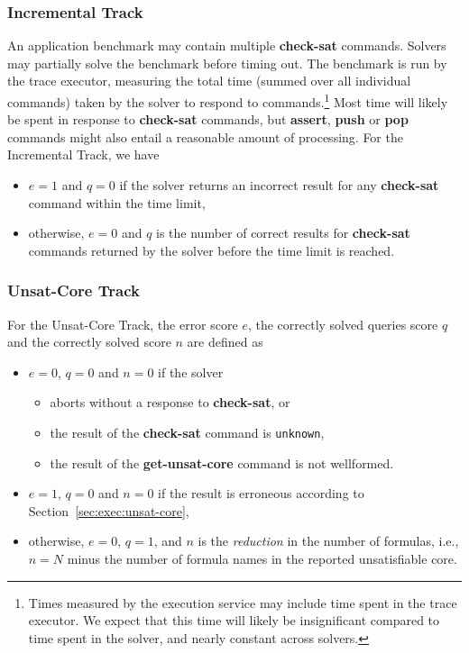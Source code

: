 \documentclass[12pt]{article}
\newcommand{\akey}[1]{\textbf{#1}\xspace}
\newcommand{\inctrack}{Incremental Track\xspace}
\newcommand{\ucoretrack}{Unsat-Core Track\xspace}
\newcommand{\executionservice}{execution service\xspace}
\begin{document}
\subsubsection{\inctrack}
%
An application benchmark may contain multiple \akey{check-sat}
commands.  Solvers may partially solve the benchmark before timing
out.  The benchmark is run by the trace executor, measuring the total
time (summed over all individual commands) taken by the solver to
respond to commands.\footnote{Times measured by the \executionservice may include
  time spent in the trace executor.  We expect that this time will
  likely be insignificant compared to time spent in the solver, and
  nearly constant across solvers.}  Most time will likely be spent in
response to \akey{check-sat} commands, but \akey{assert}, \akey{push}
or \akey{pop} commands might also entail a reasonable amount of
processing.  For the \inctrack, we have
\begin{itemize}
\item $e=1$ and $q=0$ if the solver returns an incorrect result for any
  \akey{check-sat} command within the time limit,
\item otherwise, $e=0$ and $q$ is the number of correct results for
  \akey{check-sat} commands returned by the solver before the time
  limit is reached.
\end{itemize}

\subsubsection{\ucoretrack}
  For the \ucoretrack, the error score $e$, the correctly solved queries score $q$ and the correctly solved score $n$
  are defined as
  \begin{itemize}
  \item $e=0$, $q=0$ and $n=0$ if the solver
    \begin{itemize}[noitemsep,nolistsep]
      \item aborts without a response to \akey{check-sat}, or
      \item the result of the \akey{check-sat} command is \texttt{unknown},
      \item the result of the \akey{get-unsat-core} command is not wellformed.
    \end{itemize}
  \item $e=1$, $q=0$ and $n=0$ if the result is erroneous according to
    Section~\ref{sec:exec:unsat-core},
  \item otherwise, $e=0$, $q=1$, and $n$ is the \emph{reduction} in the number of
    formulas, i.e., $n = N$ minus the number of formula names in the
    reported unsatisfiable core.
  \end{itemize}
\end{document}
